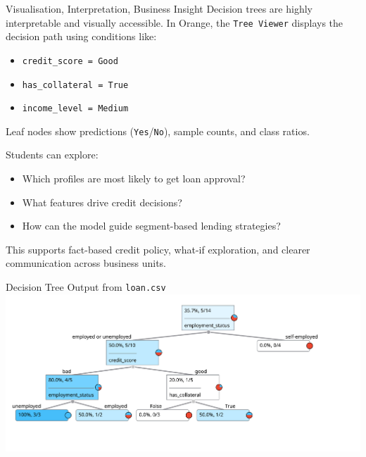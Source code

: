 \documentclass[aspectratio=169, table]{beamer}
\begin{document}
\begin{frame}{Visualisation, Interpretation, Business Insight}
	\vspace{10pt}
	Decision trees are highly interpretable and visually accessible. In Orange, the \texttt{Tree Viewer} displays the decision path using conditions like:
	\begin{itemize}
		\item \texttt{credit\_score = Good}
		\item \texttt{has\_collateral = True}
		\item \texttt{income\_level = Medium}
	\end{itemize}
	
	Leaf nodes show predictions (\texttt{Yes}/\texttt{No}), sample counts, and class ratios.
	
	Students can explore:
	\begin{itemize}
		\item Which profiles are most likely to get loan approval?
		\item What features drive credit decisions?
		\item How can the model guide segment-based lending strategies?
	\end{itemize}
	
	This supports fact-based credit policy, what-if exploration, and clearer communication across business units.
\end{frame}

\begin{frame}{Decision Tree Output from \texttt{loan.csv}}
	\vspace{10pt}
	\centering
	\includegraphics[width=\linewidth]{../../figures/loan_tree.png}
\end{frame}
\end{document}
